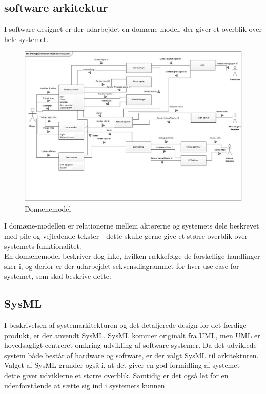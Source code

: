    \subsection{software arkitektur}
   I software designet er der udarbejdet en domæne model, der giver et overblik over hele systemet.
 \begin{figure}[H]
	\centering
	\includegraphics[width=1\textwidth]{Figurer/ISE/Domaenemodel}
	\caption{Domænemodel}
	\label{domaenemodel}
\end{figure}
   I domæne-modellen er relationerne mellem aktørerne og systemets dele beskrevet med pile og vejledende tekster - dette skulle gerne give et større overblik over systemets funktionalitet. \\ 
   En domænemodel beskriver dog ikke, hvilken rækkefølge de forskellige handlinger sker i, og derfor er der udarbejdet sekvensdiagrammet for hver use case for systemet, som skal beskrive dette:
  
 \subsection{SysML}
 I beskrivelsen af systemarkitekturen og det detaljerede design for det færdige produkt, er der 
anvendt SysML. SysML kommer originalt fra UML, men UML er hovedsagligt centreret omkring udvikling af software systemer. Da det udviklede system både består af hardware og software, er der valgt SysML til arkitekturen.\\
Valget af SysML grunder også i, at det giver en god formidling af systemet - dette giver udviklerne et større overblik. Samtidig er det også let for en udenforstående at sætte sig ind i systemets kunnen.\\

